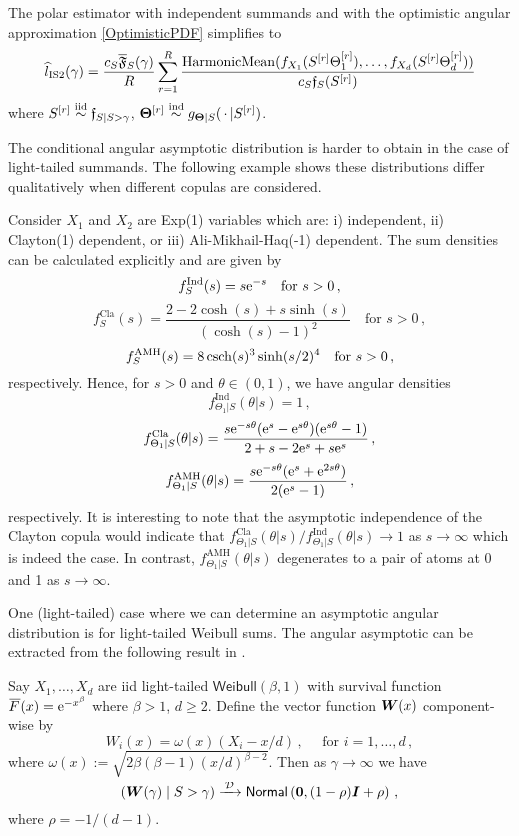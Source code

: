 \begin{remark}
The polar estimator with independent summands and with the optimistic angular approximation \eqref{OptimisticPDF} simplifies to
\[
\widehat{l}_{\mathrm{IS2}}(\gamma)
= \frac{c_S \overline{\mathfrak{F}}_S(\gamma)}{R} \sum_{r=1}^R \frac{\mathrm{HarmonicMean}( f_{X_1}( S^{[r]} \Theta^{[r]}_1), \dots, f_{X_d}( S^{[r]} \Theta^{[r]}_d) )}{c_S \mathfrak{f}_S( S^{[r]} )}
\]
where $S^{[r]} \overset{\smash{\mathrm{iid}}}{\sim} \mathfrak{f}_{S|S>\gamma}$, $\bm{\Theta}^{[r]} \overset{\smash{\mathrm{ind}}}{\sim} g_{\bm{\Theta} \mid S}( \,\cdot\, | S^{[r]})$. \remQED
\end{remark}

The conditional angular asymptotic distribution is harder to obtain in the case of light-tailed summands. The following example shows these distributions differ qualitatively when different copulas are considered.

\begin{example}
Consider $X_1$ and $X_2$ are \textsf{Exp}(1) variables which are: i) independent, ii) \textsf{Clayton}(1) dependent, or iii) \textsf{Ali-Mikhail-Haq}(-1) dependent. The sum densities can be calculated explicitly and
are given by
\[ f_S^{\mathrm{Ind}}(s) = s \mathrm{e}^{-s} \quad \text{for } s > 0 \,, \]
\[ f_S^{\mathrm{Cla}}(s) = \frac{2 - 2 \cosh(s) + s \sinh(s)}{(\cosh(s)-1)^2} \quad \text{for } s > 0 \,, \]
\[ f_S^{\mathrm{AMH}}(s) = 8 \operatorname{csch}(s)^3 \sinh(s/2)^4 \quad \text{for } s > 0 \,, \]
respectively.
Hence, for $s>0$ and $\theta \in (0,1)$, we have angular densities
\[ f^{\mathrm{Ind}}_{\Theta_1 | S}(\theta | s) = 1 \,, \]
\[ f^{\mathrm{Cla}}_{\Theta_1 | S}(\theta | s) = \frac{ s \mathrm{e}^{-s \theta}(\mathrm{e}^s - \mathrm{e}^{s \theta})(\mathrm{e}^{s \theta}-1)}{2 + s - 2\mathrm{e}^s + s \mathrm{e}^s} \,, \]
\[ f^{\mathrm{AMH}}_{\Theta_1 | S}(\theta | s) = \frac{ s \mathrm{e}^{-s \theta}(\mathrm{e}^s + \mathrm{e}^{2 s \theta})}{2(\mathrm{e}^s - 1)} \,,  \]
respectively. It is interesting to note that the asymptotic independence of the Clayton copula would indicate that $f^{\mathrm{Cla}}_{\Theta_1 | S}(\theta | s) / f^{\mathrm{Ind}}_{\Theta_1 | S}(\theta | s) \to 1$ as $s\to\infty$ which is indeed the case. In contrast, $f^{\mathrm{AMH}}_{\Theta_1 | S}(\theta | s)$ degenerates to a pair of atoms at 0 and 1 as $s \to \infty$. \remQED
\end{example}

One (light-tailed) case where we can determine an asymptotic angular distribution is for light-tailed Weibull sums. The angular asymptotic can be extracted from the following result in \cite{asmussen2017tail}.

\begin{proposition} \label{prop:light_weibull_angles}
Say $X_1, \dots, X_d$ are iid light-tailed $\mathsf{Weibull}(\beta, 1)$ with survival function $\Ftail(x)=\e^{-x^\beta}$ where $\beta>1$, $d \ge 2$.
Define the vector function $\bm{W}(x)$ component-wise by
\[ W_i(x) = \omega(x) ( X_i - x/d) \,, \quad \text{ for } i=1,\dots,d\,, \]
where $\omega(x) := \sqrt{2  \beta (\beta-1) (x/d)^{\beta-2}}$.
Then as $\gamma \to \infty$ we have
\[ (\bm{W}(\gamma) \mid S > \gamma) \xrightarrow{\:\smash{\mathcal{D}}\:} \mathsf{Normal}\left(\bm{0}, (1 - \rho) \bm{I} + \rho \right) \,,\]
where $\rho = -1/(d-1)$.
\end{proposition}

